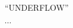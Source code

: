 
\begin{algorithm}[H]
  \begin{algorithmic}[]
	\State \Return ``UNDERFLOW''
      \EndIf

      \State $\cdots$
    \EndProcedure
  \end{algorithmic}
\end{algorithm}
